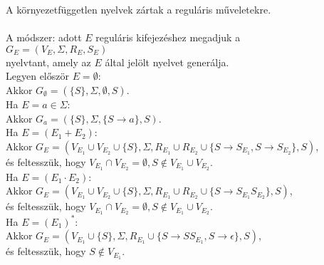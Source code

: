 \begin{frame}
\begin{tcolorbox}[squeezed title={Tétel: Környezetfüggetlen nyelvek műveleti zártsága}]
A környezetfüggetlen nyelvek zártak a reguláris műveletekre.\\
\tcblower
\msmallskip
\underline{}\\
\mmedskip
A módszer: adott $E$ reguláris kifejezéshez megadjuk a\\
$G_E = (V_E, {\Sigma}, R_E, S_E)$\\
nyelvtant, amely az $E$ által jelölt nyelvet generálja.\\
\mbigskip
Legyen először $E = \emptyset$:\\
Akkor $G_{\emptyset} = (\{S\}, {\Sigma}, \emptyset, S)$.\\
\mbigskip
Ha $E = a \in {\Sigma}$:\\
Akkor $G_a = (\{S\}, {\Sigma}, \{S \rightarrow a\}, S)$.\\
\mbigskip
Ha $E = (E_1 + E_2)$:\\
Akkor $G_E = (V_{E_1} \cup V_{E_2} \cup \{S\}, \Sigma, R_{E_1} \cup R_{E_2} \cup \{S \rightarrow S_{E_1}, S \rightarrow S_{E_2}\}, S)$,\\
és feltesszük, hogy $V_{E_1} \cap V_{E_2} = {\emptyset}, S \notin V_{E_1} \cup V_{E_2}$.\\
\mbigskip
Ha $E = (E_1 \cdot E_2)$:\\
Akkor $G_E = (V_{E_1} \cup V_{E_2} \cup \{S\}, \Sigma, R_{E_1} \cup R_{E_2} \cup \{S \rightarrow S_{E_1}S_{E_2}\}, S)$,\\
és feltesszük, hogy $V_{E_1} \cap V_{E_2} = {\emptyset}, S \notin V_{E_1} \cup V_{E_2}$.\\
\mbigskip
Ha $E = (E_1)^*$:\\
Akkor $G_E = (V_{E_1} \cup \{S\}, \Sigma, R_{E_1} \cup \{S \rightarrow SS_{E_1}, S \rightarrow \epsilon \}, S)$,\\
és feltesszük, hogy $S \notin V_{E_1}$.\\

\end{tcolorbox}
\end{frame}

